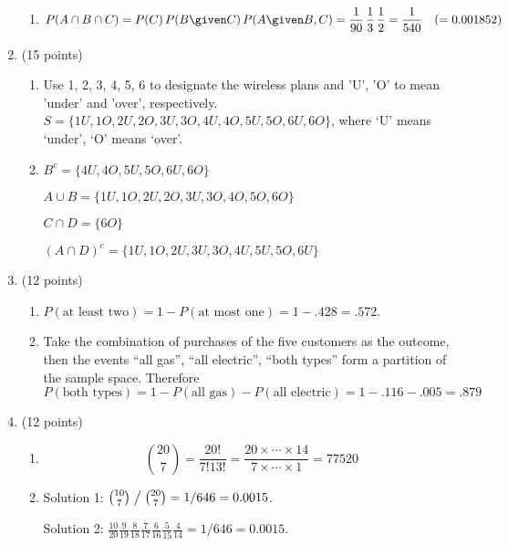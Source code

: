 \documentclass[12pt]{article}
\begin{document}
\begin{enumerate}
\begin{enumerate}
\item
\[
P(A\cap B \cap C)
= P(C)\, P(B\given C)\, P(A\given B, C)
= \frac{1}{90}\, \frac{1}{3}\, \frac{1}{2}
= \frac{1}{540}\quad (=0.001852)
\]
\end{enumerate}

\item
(15 points)

\begin{enumerate}

\item
Use 1, 2, 3, 4, 5, 6 to designate the wireless plans
and 'U', 'O' to mean 'under' and 'over', respectively.
$
S = \{1U, 1O, 2U, 2O, 3U, 3O, 4U, 4O, 5U, 5O, 6U, 6O\}
$,
where `U' means `under', `O' means `over'.

\item
$ B^c = \{4U, 4O, 5U, 5O, 6U, 6O\} $

$ A \cup B = \{1U, 1O, 2U, 2O, 3U, 3O, 4O, 5O, 6O\} $

$ C \cap D = \{6O\} $

$ (A \cap D)^c = \{1U, 1O, 2U, 3U, 3O, 4U, 5U, 5O, 6U\} $
\end{enumerate}


\item
(12 points)

\begin{enumerate}

\item
$P(\text{at least two})
 = 1 - P(\text{at most one})
 = 1 - .428
 = .572$.

\item
Take the combination of purchases of the five customers as the outcome,
then the events ``all gas'', ``all electric'',
``both types'' form a partition of the sample space.
Therefore
\[
P(\text{both types})
= 1 - P(\text{all gas}) - P(\text{all electric})
= 1 - .116 - .005
= .879\]
\end{enumerate}


\item
(12 points)

\begin{enumerate}

\item
\[ {20\choose 7} = \frac{20!}{7! 13!} =
\frac{20\times\dotsb\times 14}{7\times\dotsb\times1} = 77520\]

\item
Solution 1:
$ {10 \choose 7} \bigm/ {20 \choose 7}
  = 1/646 = 0.0015$.

Solution 2:
$ \frac{10}{20} \frac{9}{19} \frac{8}{18} \frac{7}{17} \frac{6}{16}
\frac{5}{15} \frac{4}{14} = 1/646 = 0.0015$.
\end{enumerate}


\end{enumerate}
\end{document}
